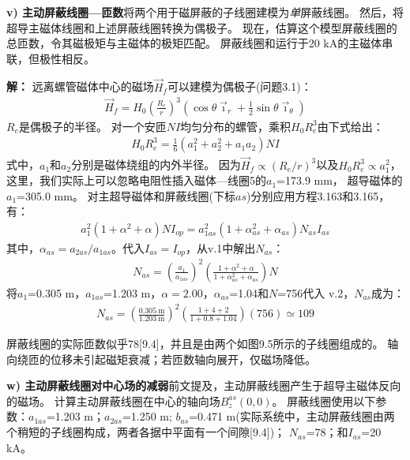 \textbf{v) 主动屏蔽线圈---匝数}\qquad 将两个用于磁屏蔽的子线圈建模为\textit{单}屏蔽线圈。
然后，将超导主磁体线圈和上述屏蔽线圈转换为偶极子。
现在，估算这个模型屏蔽线圈的总匝数，令其磁极矩与主磁体的极矩匹配。
屏蔽线圈和运行于20 kA的主磁体串联，但极性相反。

\textbf{解：} 远离螺管磁体中心的磁场$\vec{H}_f$可以建模为偶极子(问题3.1)：
\begin{align*}%
\vec{H}_f=H_0\left(\frac{R_e}{r}\right)^3\left(\cos\theta{\vec{\imath}_r}+\frac{1}{2}\sin\theta\vec{\imath}_\theta\right) \tag{3.163}
\end{align*}
$R_e$是偶极子的半径。
对一个安匝$NI$均匀分布的螺管，乘积$H_0 R_e^3$由下式给出：
\begin{align*}%
H_0R_e^3=\frac{1}{6}(a_1^2+a_2^2+a_1a_2)NI \tag{3.165}
\end{align*}
式中，$a_1$和$a_2$分别是磁体绕组的内外半径。
因为$\vec{H}_f\propto (R_e/r)^3$以及$H_0 R_e^3\propto a_1^2$，
这里，我们实际上可以忽略电阻性插入磁体---线圈5的$a_1$=173.9 mm，
超导磁体的$a_1$=305.0 mm。
对主超导磁体和屏蔽线圈(下标$as$)分别应用方程3.163和3.165，有：
\begin{align*}%
a_1^2(1+\alpha^2+\alpha)NI_{op}=a_{1as}^2(1+\alpha_{as}^2+\alpha_{as})N_{as}I_{as} \tag{v.1}
\end{align*}
其中，$\alpha_{as}=a_{2as}/a_{1as}$。代入$I_{as}=I_{op}$，从v.1中解出$N_{as}$：
\begin{align*}%
N_{as}=(\frac{a_1}{a_{1as}})^2(\frac{1+\alpha^2+\alpha}{1+\alpha_{as}^2+\alpha_{as}})N \tag{v.2}
\end{align*}
将$a_1$=0.305 m，$a_{1as}$=1.203 m，$\alpha=2.00$，$\alpha_{as}$=1.04和$N$=756代入
v.2，$N_{as}$成为：
\begin{align*}%
N_{as}=(\frac{0.305\ \mathrm{m}}{1.203\ \mathrm{m}})^2(\frac{1+4+2}{1+0.8+1.04})(756)\simeq 109
\end{align*}

屏蔽线圈的实际匝数似乎78[9.4]，并且是由两个如图9.5所示的子线圈组成的。
轴向绕匝的位移未引起磁矩衰减；若匝数轴向展开，仅磁场降低。

\textbf{w) 主动屏蔽线圈对中心场的减弱}\qquad 前文提及，主动屏蔽线圈产生于超导主磁体反向的磁场。
计算主动屏蔽线圈在中心的轴向场$B_z^{as}(0,0)$。
屏蔽线圈使用以下参数：$a_{1as}$=1.203 m；$a_{2as}$=1.250 m;
$b_{as}$=0.471 m(实际系统中，主动屏蔽线圈由两个稍短的子线圈构成，两者各据中平面有一个间隙[9.4])；
$N_{as}$=78；和$I_{as}$=20 kA。

